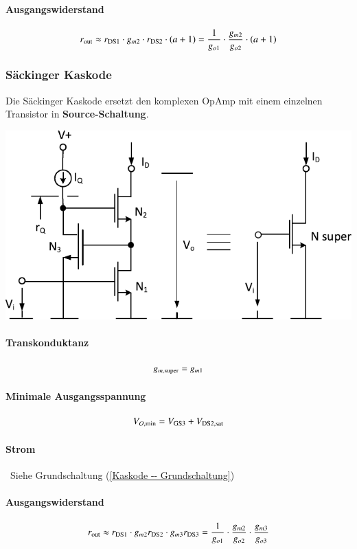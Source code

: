 \paragraph{Ausgangswiderstand}

\vspace{-0.3cm}
\[
    r_{\rm out} \approx r_{\rm DS1} \cdot g_{m2} \cdot r_{\rm DS2} \cdot (a + 1) = \frac{1}{g_{o1}} \cdot \frac{g_{m2}}{g_{o2}} \cdot (a + 1)
\]


\subsubsection{Säckinger Kaskode}
Die Säckinger Kaskode ersetzt den komplexen OpAmp mit einem einzelnen Transistor in \textbf{Source-Schaltung}.

\smallskip

\begin{minipage}[t]{0.5\columnwidth}
    \includegraphics[width=\columnwidth, align=t]{images/05_stromquelle_geregelte_kaskode_FET.pdf}
\end{minipage}
\hfill
\begin{minipage}[t]{0.46\columnwidth}

    \paragraph{Transkonduktanz}

    \vspace{-0.3cm}
    \[
        g_{m,\rm super} = g_{m1}
    \]            

    \paragraph{Minimale Ausgangsspannung}

    \vspace{-0.2cm}
    \[
        V_{O, \rm min} =  V_{\rm GS3} + V_{\rm DS2, sat}
    \]

    \paragraph{Strom}

    \textrightarrow\ Siehe Grundschaltung (\ref{Kaskode -- Grundschaltung})
\end{minipage}


\paragraph{Ausgangswiderstand}

\vspace{-0.3cm}
\[
    r_{\rm out} \approx r_{\rm DS1} \cdot g_{m2} r_{\rm DS2} \cdot g_{m3} r_{\rm DS3} = \frac{1}{g_{o1}} \cdot \frac{g_{m2}}{g_{o2}} \cdot \frac{g_{m3}}{g_{o3}}
\]

